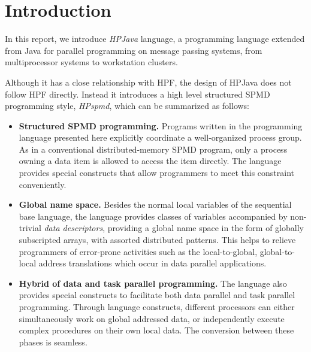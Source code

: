 
\section{Introduction}

In this report, we introduce \emph{HPJava} language, a programming
language extended from Java for parallel programming on message
passing systems, from multiprocessor systems to workstation clusters.

Although it has a close relationship with HPF\cite{HPF96}, the design
of HPJava does not follow HPF directly.  Instead it introduces a high
level structured SPMD programming style, \emph{HPspmd}, which can be
summarized as follows:
\begin{itemize}
\item \textbf{Structured SPMD programming.} Programs written in the
  programming language presented here explicitly coordinate a
  well-organized process group. As in a conventional
  distributed-memory SPMD program, only a process owning a data item
  is allowed to access the item directly.  The language provides
  special constructs that allow programmers to meet this constraint
  conveniently.
  
\item \textbf{Global name space.} Besides the normal local variables of
  the sequential base language, the language provides classes of
  variables accompanied by non-trivial \emph{data descriptors},
  providing a global name space in the form of globally subscripted
  arrays, with assorted distributed patterns. This helps to relieve
  programmers of error-prone activities such as the local-to-global,
  global-to-local address translations which occur in data parallel
  applications.
  
\item \textbf{Hybrid of data and task parallel programming.} The
  language also provides special constructs to facilitate both data
  parallel and task parallel programming. Through language constructs,
  different processors can either simultaneously work on global
  addressed data, or independently execute complex procedures on their
  own local data. The conversion between these phases is seamless.
  

\end{itemize}
